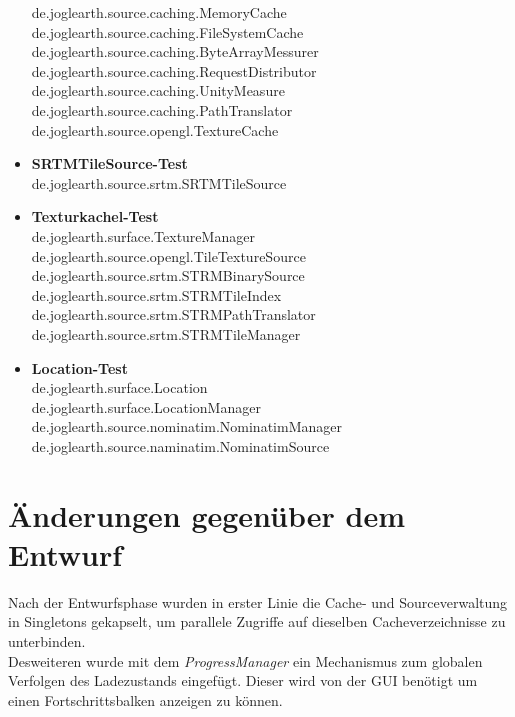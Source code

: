 \documentclass[10pt]{scrreprt}
\begin{document}
\begin{itemize}
 de.joglearth.source.caching.MemoryCache\\
 de.joglearth.source.caching.FileSystemCache\\
 de.joglearth.source.caching.ByteArrayMessurer\\
 de.joglearth.source.caching.RequestDistributor\\
 de.joglearth.source.caching.UnityMeasure\\
 de.joglearth.source.caching.PathTranslator
 de.joglearth.source.opengl.TextureCache\\
 \item \textbf{SRTMTileSource-Test}\\
 de.joglearth.source.srtm.SRTMTileSource
 \item \textbf{Texturkachel-Test}\\
 de.joglearth.surface.TextureManager\\
 de.joglearth.source.opengl.TileTextureSource\\
 de.joglearth.source.srtm.STRMBinarySource\\
 de.joglearth.source.srtm.STRMTileIndex\\
 de.joglearth.source.srtm.STRMPathTranslator\\
 de.joglearth.source.srtm.STRMTileManager
 \item \textbf{Location-Test}\\
 de.joglearth.surface.Location\\
 de.joglearth.surface.LocationManager\\
 de.joglearth.source.nominatim.NominatimManager\\
 de.joglearth.source.naminatim.NominatimSource
\end{itemize}



\chapter{Änderungen gegenüber dem Entwurf}

Nach der Entwurfsphase wurden in erster Linie die Cache- und Sourceverwaltung in Singletons gekapselt, um parallele Zugriffe auf dieselben Cacheverzeichnisse zu unterbinden. \\

Desweiteren wurde mit dem \textit{ProgressManager} ein Mechanismus zum globalen Verfolgen des Ladezustands eingefügt. Dieser wird von der GUI benötigt um einen Fortschrittsbalken anzeigen zu können. \\
\end{document}
